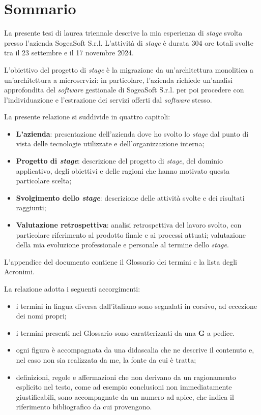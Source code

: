 \vspace{0.5 em}
\chapter*{Sommario}
\vspace{0.5cm}
\noindent La presente tesi di laurea triennale descrive la mia esperienza di \textit{stage} svolta presso l'azienda SogeaSoft S.r.l. L'attività di \textit{stage} è durata 304 ore totali svolte tra il 23 settembre e il 17 novembre 2024. 

\vspace{0.5 em}
\noindent L'obiettivo del progetto di \textit{stage} è la migrazione da un'architettura monolitica a un'architettura a microservizi: in particolare, l'azienda richiede un'analisi approfondita del \textit{software} gestionale di SogeaSoft S.r.l. per poi procedere con l'individuazione e l'estrazione dei servizi offerti dal \textit{software} stesso. 

\vspace{0.5 em}
\noindent La presente relazione si suddivide in quattro capitoli:
\begin{itemize}
    \item \textbf{L'azienda}: presentazione dell'azienda dove ho svolto lo \textit{stage} dal punto di vista delle tecnologie utilizzate e dell'organizzazione interna;
    \item \textbf{Progetto di \textit{stage}}: descrizione del progetto di \textit{stage}, del dominio applicativo, degli obiettivi e delle ragioni che hanno motivato questa particolare scelta;
    \item \textbf{Svolgimento dello \textit{stage}}: descrizione delle attività svolte e dei risultati raggiunti;
    \item \textbf{Valutazione retrospettiva}: analisi retrospettiva del lavoro svolto, con particolare riferimento al prodotto finale e ai processi attuati; valutazione della mia evoluzione professionale e personale al termine dello \textit{stage}.
   \end{itemize}

\noindent L'appendice del documento contiene il Glossario dei termini e la lista degli Acronimi. 

\vspace{0.5 em}
\noindent La relazione adotta i seguenti accorgimenti:
\begin{itemize}
    \item i termini in lingua diversa dall'italiano sono segnalati in corsivo, ad eccezione dei nomi propri;
    \item i termini presenti nel Glossario sono caratterizzati da una \textbf{G} a pedice. 
    \item ogni figura è accompagnata da una didascalia che ne descrive il contenuto e, nel caso non sia realizzata da me, la fonte da cui è tratta;
    \item definizioni, regole e affermazioni che non derivano da un ragionamento esplicito nel testo, come ad esempio conclusioni non immediatamente giustificabili, sono accompagnate da un numero ad apice, che indica il riferimento bibliografico da cui provengono. 
\end{itemize}

\clearpage